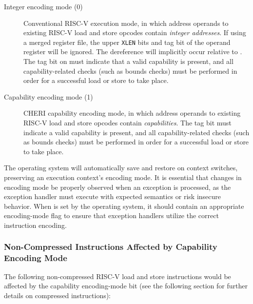 \begin{description}
\item[Integer encoding mode (0)] Conventional RISC-V execution mode, in which
  address operands to existing RISC-V load and store opcodes contain
  \textit{integer addresses}.
  If using a merged register file, the upper \texttt{XLEN} bits and tag bit of
  the operand register will be ignored.
  The dereference will implicitly occur relative to \DDC{}.
  The tag bit on \DDC{} must indicate that a valid capability is present, and
  all capability-related checks (such as bounds checks) must be performed in
  order for a successful load or store to take place.

\item[Capability encoding mode (1)] CHERI capability encoding mode, in which address operands to
  existing RISC-V load and store opcodes contain \textit{capabilities}.
  The tag bit must indicate a valid capability is present, and all
  capability-related checks (such as bounds checks) must be performed in order
  for a successful load or store to take place.
\end{description}

The operating system will automatically save and restore \PCC{} on context
switches, preserving an execution context's encoding mode.
It is essential that changes in encoding mode be properly observed when an
exception is processed, as the exception handler must execute with expected
semantics or risk insecure behavior.
When \xTCC{} is set by the operating system, it should contain an appropriate
encoding-mode flag to ensure that exception handlers utilize the correct
instruction encoding.

\subsubsection{Non-Compressed Instructions Affected by Capability Encoding
  Mode}

The following non-compressed RISC-V load and store instructions would be
affected by the capability encoding-mode bit (see the following section for
further details on compressed instructions):

\medskip

